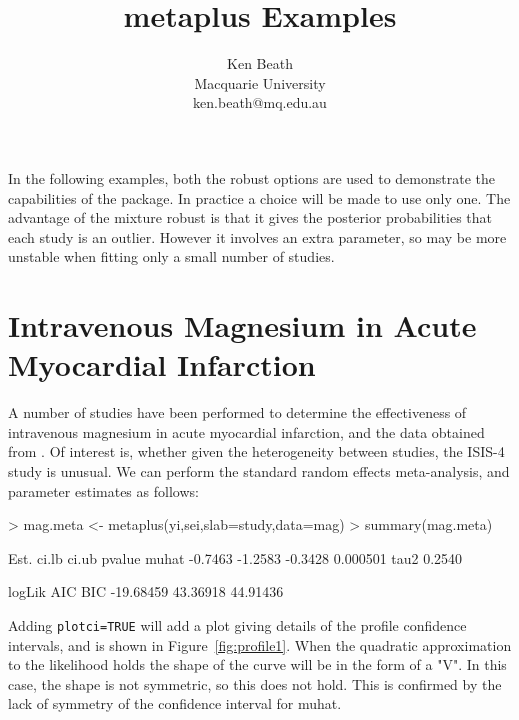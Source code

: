 \documentclass{article}
\title{metaplus Examples}
\author{Ken Beath\\Macquarie University\\ken.beath@mq.edu.au}
\begin{document}
\maketitle



In the following examples, both the robust options are used to demonstrate the capabilities of the package. In practice a choice will be made to use only one. The advantage of the mixture robust is that it gives the posterior probabilities that each study is an outlier. However it involves an extra parameter, so may be more unstable when fitting only a small number of studies.

\section{Intravenous Magnesium in Acute Myocardial Infarction}

A number of studies have been performed to determine the effectiveness of intravenous magnesium in acute myocardial infarction, and the data obtained from \cite{Sterne2001}. Of interest is, whether given the heterogeneity between studies, the ISIS-4 study is unusual.
We can perform the standard random effects meta-analysis, and parameter estimates as follows:
\begin{Schunk}
\begin{Sinput}
> mag.meta <- metaplus(yi,sei,slab=study,data=mag)
> summary(mag.meta)
\end{Sinput}
\begin{Soutput}
         Est.   ci.lb   ci.ub   pvalue
muhat -0.7463 -1.2583 -0.3428 0.000501
tau2   0.2540                         

     logLik      AIC      BIC
  -19.68459 43.36918 44.91436
\end{Soutput}
\end{Schunk}

Adding \texttt{plotci=TRUE} will add a plot giving details of the profile confidence intervals, and is shown in Figure~\ref{fig:profile1}. When the quadratic approximation to the likelihood holds the shape of the curve will be in the form of a "V". In this case, the shape is not symmetric, so this does not hold. This is confirmed by the lack of symmetry of the confidence interval for muhat. 
\end{document}
